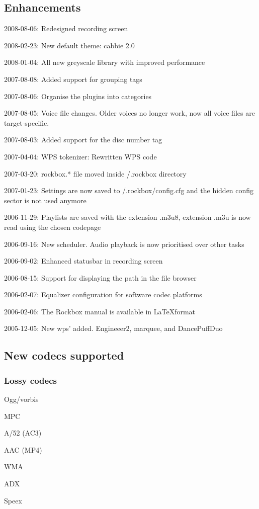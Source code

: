 \subsection{Enhancements}
\begin{changelog}
\item 2008-08-06: Redesigned recording screen
\item 2008-02-23: New default theme: cabbie 2.0
\item 2008-01-04: All new greyscale library with improved performance
\item 2007-08-08: Added support for grouping tags
\item 2007-08-06: Organise the plugins into categories
\item 2007-08-05: Voice file changes. Older voices no longer work, now
  all voice files are target-specific.
\item 2007-08-03: Added support for the disc number tag
\item 2007-04-04: WPS tokenizer: Rewritten WPS code
\item 2007-03-20: rockbox.* file moved inside /.rockbox directory
\item 2007-01-23: Settings are now saved to /.rockbox/config.cfg and
  the hidden config sector is not used anymore
\item 2006-11-29: Playlists are saved with the extension .m3u8,
  extension .m3u is now read using the chosen codepage
\item 2006-09-16: New scheduler. Audio playback is now prioritised
  over other tasks
\item 2006-09-02: Enhanced statusbar in recording screen
\item 2006-08-15: Support for displaying the path in the file browser
\item 2006-02-07: Equalizer configuration for software codec platforms
\item 2006-02-06: The Rockbox manual is available in \LaTeX format
\item 2005-12-05: New wps' added. Engineeer2, marquee, and DancePuffDuo
\end{changelog}

\subsection{New codecs supported}
\subsubsection{Lossy codecs}
\begin{changelog}
\item Ogg/vorbis
\item MPC
\item A/52 (AC3)
\item AAC (MP4)
\item WMA
\item ADX
\item Speex
\end{changelog}

